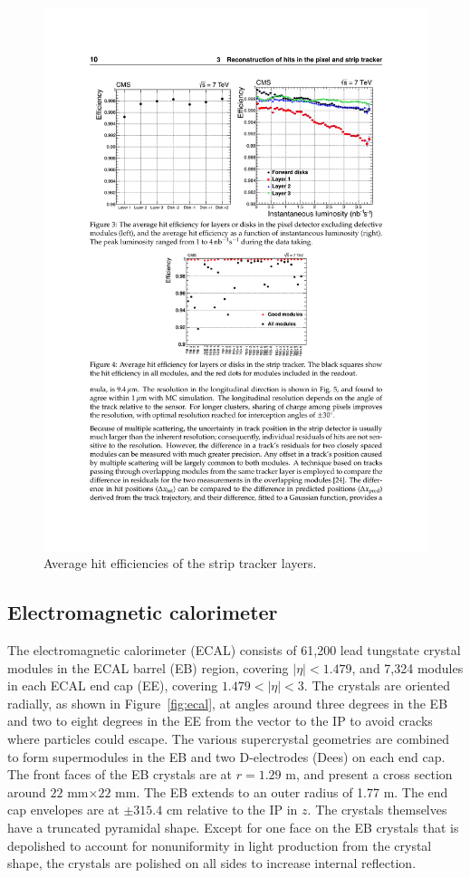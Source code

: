 \begin{figure}[tbh]
\centering
\includegraphics[width=5in]{figures/stripeff.pdf}
\caption{Average hit efficiencies of the strip tracker layers.}
\label{fig:stripeff}
\end{figure}

\subsection{Electromagnetic calorimeter}

The electromagnetic calorimeter (ECAL) consists of 61,200 lead tungstate crystal modules in the ECAL barrel (EB) region, covering $|\eta|<1.479$, and 7,324 modules in each ECAL end cap (EE), covering $1.479<|\eta|<3$. The crystals are oriented radially, as shown in Figure~\ref{fig:ecal}, at angles around three degrees in the EB and two to eight degrees in the EE from the vector to the IP to avoid cracks where particles could escape. The various supercrystal geometries are combined to form supermodules in the EB and two D-electrodes (Dees) on each end cap. The front faces of the EB crystals are at $r=1.29$ m, and present a cross section around $22$ mm$\times$$22$ mm. The EB extends to an outer radius of 1.77 m. The end cap envelopes are at $\pm315.4$ cm relative to the IP in $z$. The crystals themselves have a truncated pyramidal shape. Except for one face on the EB crystals that is depolished to account for nonuniformity in light production from the crystal shape, the crystals are polished on all sides to increase internal reflection. 

